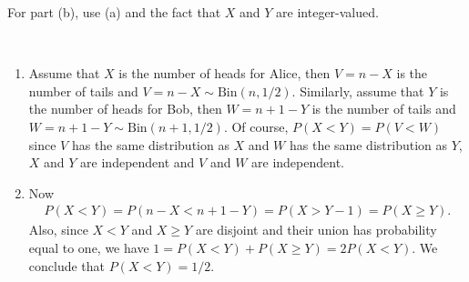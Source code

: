 
\setcounter{theorem}{24}
\begin{exercise}[BH.3.25]
\begin{hint}
	For part (b), use (a) and the fact that $X$ and $Y$ are integer-valued.
\end{hint}
\begin{solution}~
	\begin{enumerate}
	    \item Assume that $X$ is the number of heads for Alice, then $V=n-X$ is the number of tails and $V=n-X\sim \text{Bin}(n,1/2)$. Similarly, assume that $Y$ is the number of heads for Bob, then $W=n+1-Y$ is the number of tails and $W=n+1-Y\sim \text{Bin}(n+1,1/2)$. Of course, $P(X<Y)=P(V<W)$ since $V$ has the same distribution as $X$ and $W$ has the same distribution as $Y$, $X$ and $Y$ are independent and $V$ and $W$ are independent.
        \item Now
        \begin{align*}
        	P(X<Y) = P(n-X<n+1-Y) = P(X>Y-1) = P(X\geq Y).
        \end{align*}
        Also, since $X<Y$ and $X\geq Y$ are disjoint and their union has probability equal to one, we have $1=P(X<Y) + P(X\geq Y) = 2P(X<Y)$. We conclude that $P(X<Y)=1/2$. 
	\end{enumerate}
\end{solution}
\end{exercise}


